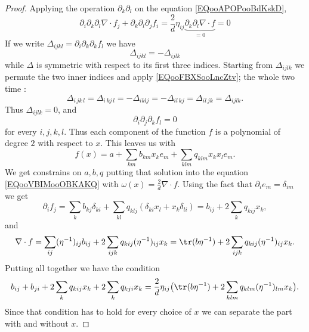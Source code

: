 \begin{proof}
    Applying the operation \( \partial_k\partial_l\) on the equation \eqref{EQooAPOPooBdKskD},
    \begin{equation}
        \partial_i\partial_k\partial_l\nabla\cdot f_j+\partial_k\partial_l\partial_j f_i=\frac{ 2 }{ d }\eta_{ij}\underbrace{\partial_k\partial_l\nabla\cdot f}_{=0}=0
    \end{equation}
    If we write \( \Delta_{ijkl}=\partial_i\partial_k\partial_k f_l\) we have
    \begin{equation}    \label{EQooFBXSooLncZtv}
        \Delta_{ijkl}=-\Delta_{ijlk}
    \end{equation}
    while \( \Delta\) is symmetric with respect to its first three indices. Starting from \( \Delta_{ijlk}\) we permute the two inner indices and apply \eqref{EQooFBXSooLncZtv}; the whole two time :
    \begin{equation}
        \Delta_{i\,jk\,l}=\Delta_{i\,kj\,l}=-\Delta_{iklj}=-\Delta_{il\,kj}=\Delta_{il\,jk}=\Delta_{ijlk}.
    \end{equation}
    Thus \( \Delta_{ijlk}=0\), and
    \begin{equation}
        \partial_i\partial_j\partial_kf_l=0
    \end{equation}
    for every \( i,j,k,l\). Thus each component of the function \( f\) is a polynomial of degree \( 2\) with respect to \( x\). This leaves us with
    \begin{equation}
        f(x)=a+\sum_{km}b_{km}x_ke_m+\sum_{klm}q_{klm}x_kx_le_m.
    \end{equation}
    We get constrains on \( a,b,q\) putting that solution into the equation \eqref{EQooVBIMooOBKAKQ} with \( \omega(x)=\frac{ 2 }{ d }\nabla\cdot f\). Using the fact that \( \partial_ie_m=\delta_{im}\) we get
    \begin{equation}
        \partial_if_j=\sum_kb_{kj}\delta_{ki}+\sum_{kl}q_{klj}(\delta_{ki}x_l+x_k\delta_{li})=b_{ij}+2\sum_kq_{kij}x_k,
    \end{equation}
    and
    \begin{equation}
        \nabla\cdot f=\sum_{ij}(\eta^{-1})_{ij}b_{ij}+2\sum_{ijk}q_{kij}(\eta^{-1})_{ij}x_k=\tr(b\eta^{-1})+2\sum_{ijk}q_{kij}(\eta^{-1})_{ij}x_k.
    \end{equation}
    Putting all together we have the condition
    \begin{equation}
        b_{ij}+b_{ji}+2\sum_{k}q_{kij}x_k+2\sum_kq_{kji}x_k=\frac{ 2 }{ d }\eta_{ij}\big( \tr(b\eta^{-1})+2\sum_{klm}q_{klm}(\eta^{-1})_{lm}x_k \big).
    \end{equation}
    Since that condition has to hold for every choice of \( x\) we can separate the part with and without \( x\).


\end{proof}
